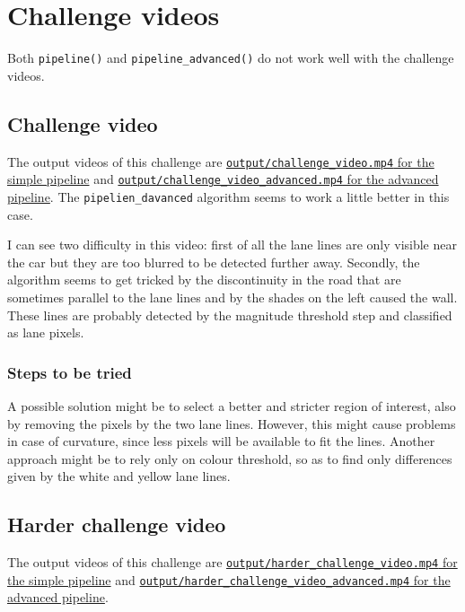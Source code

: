 \documentclass{article}
\let\cd\lstinline
\begin{document}
\section{Challenge videos}
Both \cd+pipeline()+ and \cd+pipeline_advanced()+ do not work well with the challenge videos.

\subsection{Challenge video}
The output videos of this challenge are \href{https://github.com/FrancescoBoi/AdvancedLaneDetection/blob/master/output/challenge_video.mp4}{\cd+output/challenge_video.mp4+ for the simple pipeline} and \href{https://github.com/FrancescoBoi/AdvancedLaneDetection/blob/master/output/challenge_video_advanced.mp4}{\cd+output/challenge_video_advanced.mp4+ for the advanced pipeline}. The \cd+pipelien_davanced+ algorithm seems to work a little better in this case.

I can see two difficulty in this video: first of all the lane lines are only visible near the car but they are too blurred to be detected further away. Secondly, the algorithm seems to get tricked by the discontinuity in the road that are sometimes parallel to the lane lines and by the shades on the left caused the wall. These lines are probably detected by the magnitude threshold step and classified as lane pixels. 

\subsubsection{Steps to be tried}
A possible solution might be to select a better and stricter region of interest, also by removing the pixels by the two lane lines. However, this might cause problems in case of curvature, since less pixels will be available to fit the lines. Another approach might be to rely only on colour threshold, so as to find only differences given by the white and yellow lane lines.

\subsection{Harder challenge video}
The output videos of this challenge are \href{https://github.com/FrancescoBoi/AdvancedLaneDetection/blob/master/output/harder_challenge_video.mp4}{\cd+output/harder_challenge_video.mp4+ for the simple pipeline} and \href{https://github.com/FrancescoBoi/AdvancedLaneDetection/blob/master/output/harder_challenge_video_advanced.mp4}{\cd+output/harder_challenge_video_advanced.mp4+ for the advanced pipeline}.
\end{document}

